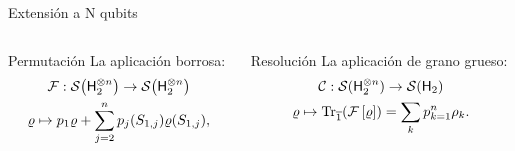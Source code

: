 \begin{frame}{Extensión a N qubits}
    \begin{columns}
        \begin{column}{0.5\textwidth}
            \begin{block}{Permutación}
            La aplicación borrosa\pause:
            \begin{equation}
                \begin{gathered}
                \mathcal{F}:\mathcal{S}\qty( {\sf H}_{2}^{\otimes n})\to \mathcal{S}\qty( {\sf H}_{2}^{\otimes n})\nonumber\\
                \varrho \mapsto p_{1}\varrho+\sum_{j=2}^{n}p_{j}(S_{1,j})\varrho(S_{1,j}),\nonumber
            \end{gathered}\nonumber
        \end{equation}
    \end{block}
        \end{column}
        \pause
        \begin{column}{0.5\textwidth}
            \begin{block}{Resolución}
        La aplicación de grano grueso\pause:
        \begin{equation}
            \begin{gathered}
                \mathcal{C}:\mathcal{S}( {\sf H}_{2}^{\otimes n})\to \mathcal{S}({\sf H}_{2})\\
                \varrho\mapsto\Tr_{\overline{1}}(\mathcal{F}\left[\varrho\right]) = \sum_{k}p_{k=1}^{n}\rho_{k}.
            \end{gathered}\nonumber
        \end{equation}
    \end{block}
        \end{column}
    \end{columns}
\end{frame}


